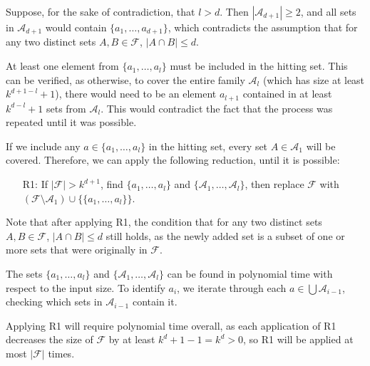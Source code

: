 \documentclass[12pt]{article}
\begin{document}
	Suppose, for the sake of contradiction, that \(l > d\). Then
	\(|\mathcal{A}_{d + 1}| \geqslant 2\), and all sets in
	\(\mathcal{A}_{d + 1}\) would contain \(\{a_{1}, \ldots, a_{d + 1}\}\),
	which contradicts the assumption that for any two distinct sets \(A, B \in
	\mathcal{F}\), \(|A \cap B| \leqslant d\).
	
	\medskip
	
	At least one element from \(\{a_{1}, \ldots, a_{l}\}\) must be included in
	the hitting set. This can be verified, as otherwise, to cover the entire
	family \(\mathcal{A}_{l}\) (which has size at least \(k^{d + 1 - l} + 1\)),
	there would need to be an element \(a_{l + 1}\) contained in at least
	\(k^{d - l} + 1\) sets from \(\mathcal{A}_{l}\). This would contradict the
	fact that the process was repeated until it was possible.
	
	\medskip
	
	If we include any \(a \in \{a_{1}, \ldots, a_{l}\}\) in the hitting set,
	every set \(A \in \mathcal{A}_{1}\) will be covered. Therefore, we can apply
	the following reduction, until it is possible:
	\begin{itemize}
		\item[R1:] If \(|\mathcal{F}| > k^{d + 1}\), find \(\{a_{1}, \ldots,
		           a_{l}\}\) and \(\{\mathcal{A}_{1}, \ldots,
		           \mathcal{A}_{l}\}\), then replace \(\mathcal{F}\) with
		           \((\mathcal{F} \setminus \mathcal{A}_{1}) \cup \{\{a_{1},
		           \ldots, a_{l}\}\}\).
	\end{itemize}
	Note that after applying R1, the condition that for any two distinct sets
	\(A, B \in \mathcal{F}\), \(|A \cap B| \leqslant d\) still holds, as the
	newly added set is a subset of one or more sets that were originally in
	\(\mathcal{F}\).
	
	\medskip
	
	The sets \(\{a_{1}, \ldots, a_{l}\}\) and \(\{\mathcal{A}_{1}, \ldots,
	\mathcal{A}_{l}\}\) can be found in polynomial time with respect to the
	input size. To identify \(a_{i}\), we iterate through each \(a \in \bigcup
	\mathcal{A}_{i - 1}\), checking which sets in \(\mathcal{A}_{i - 1}\)
	contain it.
	
	\medskip
	
	Applying R1 will require polynomial time overall, as each application of R1
	decreases the size of \(\mathcal{F}\) by at least \(k^{d} + 1 - 1 = k^{d} >
	0\), so R1 will be applied at most \(|\mathcal{F}|\) times.
	
	\medskip
	
\end{document}

